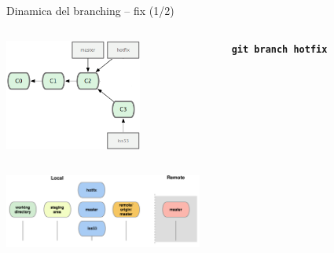 \documentclass{beamer}
\begin{document}
\begin{frame}{\centerline{Dinamica del branching -- fix (1/2)}}
  \begin{columns}
    \begin{column}{0.6\linewidth}
      \begin{center}
        \includegraphics[width=4.5cm]{UniBo.IDSEPC.A2023.LavoroCondiviso/18333fig0313b-tn}
      \end{center}
    \end{column}
    \begin{column}{0.45\linewidth}
      \begin{center}
        \texttt{\textbf{git branch hotfix}}\\
      \end{center}
    \end{column}
  \end{columns}
  \begin{center}
    \includegraphics[width=6.5cm]{UniBo.IDSEPC.A2023.LavoroCondiviso/git-branch2}
  \end{center}
\end{frame}
\end{document}
